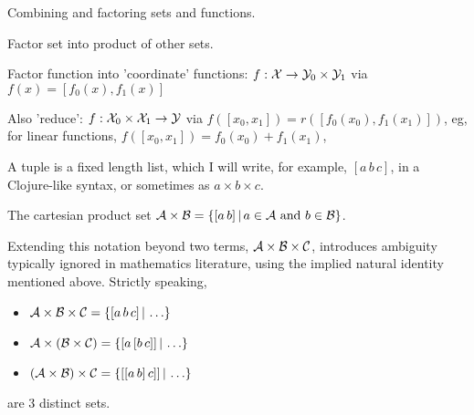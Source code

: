 \setcounter{currentlevel}{\value{baseSectionLevel}}
\label{sec:Cartesian-products}

Combining and factoring sets and functions.

Factor set into product of other sets.

Factor function into 'coordinate' functions:
$f : \mathcal{X} \rightarrow \mathcal{Y}_0 \times \mathcal{Y}_1$
via
$f \left( x \right) = 
\left[ f_0\left( x \right) , f_1\left( x \right) \right]$

Also 'reduce':
$f : \mathcal{X}_0 \times \mathcal{X}_1 \rightarrow \mathcal{Y}$
via 
 $f\left( \left[ x_0, x_1 \right] \right)
= r \left(
\left[ f_0 \left( x_0 \right) , f_1 \left( x_1 \right) \right] 
\right)$,
eg, for linear functions, 
 $f\left( \left[ x_0, x_1 \right] \right)
=  f_0 \left( x_0 \right) + f_1 \left( x_1 \right)$,

\label{sec:Cartesian-product-sets}

A tuple is a fixed length list, which I will write, for example,
$[a \, b \, c]$, in a Clojure-like syntax,
or sometimes as $a \times b \times c$.

The cartesian product set 
$\mathcal{A} \times \mathcal{B} =
 \left\{ [a \, b]  \, | \,  a \in \mathcal{A} \text{ and } b \in \mathcal{B}  \right\} $.

Extending this notation beyond two terms,
$\mathcal{A} \times \mathcal{B} \times \mathcal{C}$,
introduces ambiguity typically ignored in mathematics literature,
using the implied natural identity mentioned above.
Strictly speaking,
\begin{itemize}
  \item $\mathcal{A} \times \mathcal{B} \times \mathcal{C} = 
   \left\{ [a \, b \, c]  \, | \,  \ldots  \right\} $
  \item $\mathcal{A} \times (\mathcal{B} \times \mathcal{C}) = 
   \left\{ [a \, [b \,c]]  \, | \,  \ldots  \right\} $
  \item $(\mathcal{A} \times \mathcal{B}) \times \mathcal{C} = 
   \left\{ [[a \, b] \, c]]  \, | \,  \ldots  \right\} $
\end{itemize}
are 3 distinct sets.

\label{sec:Generalized-tuples}

